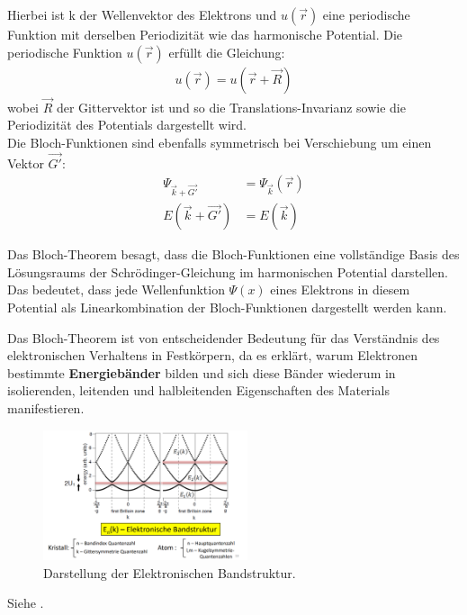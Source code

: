 Hierbei ist k der Wellenvektor des Elektrons und $u(\vec{r})$ eine periodische Funktion mit derselben Periodizität wie das harmonische Potential. Die periodische Funktion $u(\vec{r})$ erfüllt die Gleichung:
\begin{align}
    u(\vec{r}) = u(\vec{r}+\vec{R})
\end{align}
wobei $\vec{R} $ der Gittervektor ist und so die Translations-Invarianz sowie die Periodizität des Potentials dargestellt wird. \\

Die Bloch-Funktionen sind ebenfalls symmetrisch bei Verschiebung um einen Vektor $\vec{G'}$:
\begin{align}
    \Psi _{\vec{k} + \vec{G'}} &= \Psi _{\vec{k}} (\vec{r}) \\
    E(\vec{k} + \vec{G'}) &= E(\vec{k})
\end{align}

Das Bloch-Theorem besagt, dass die Bloch-Funktionen eine vollständige Basis des Lösungsraums der Schrödinger-Gleichung im harmonischen Potential darstellen. Das bedeutet, dass jede Wellenfunktion $\Psi(x)$ eines Elektrons in diesem Potential als Linearkombination der Bloch-Funktionen dargestellt werden kann.

Das Bloch-Theorem ist von entscheidender Bedeutung für das Verständnis des elektronischen Verhaltens in Festkörpern, da es erklärt, warum Elektronen bestimmte \textbf{Energiebänder} bilden und sich diese Bänder wiederum in isolierenden, leitenden und halbleitenden Eigenschaften des Materials manifestieren.

\begin{figure}
    \centering
    \includegraphics[width=6cm]{resources/05-05-2015/frage8_blochtheorem.PNG}
    \caption{Darstellung der Elektronischen Bandstruktur.}
\end{figure}

\label{q:9}

\label{q:10}

Siehe .


\newpage
